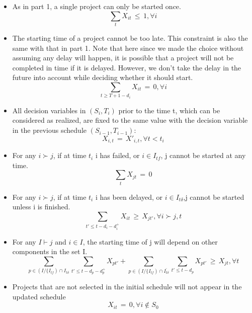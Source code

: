\documentclass[final,3p,times]{elsarticle}
\begin{document}
\begin{itemize}\label{StartCon}
\item As in part 1, a single project can only be started once.
\begin{equation}
	\label{EqnStartOnlyOnce2}
\sum\limits_{t} X_{it}\,\leq\,1,\forall i
\end{equation}
\item The starting time of a project cannot be too late. This constraint is also the same with that in part 1. Note that here since we made the choice without assuming any delay will happen, it is possible that a project will not be completed in time if it is delayed. However, we don't take the delay  in the future into account while deciding whether it should start.
\begin{equation}
\sum\limits_{t\geq T+1-d_i} X_{it}\,=\,0, \forall i
\end{equation}
\item All decision variables in $(S_i, T_i)$ prior to the time t, which can be considered as realized, are fixed to the same value with the decision variable in the previous schedule $(S_{i-1},T_{i-1})$:
\begin{equation}
X_{i,t}\,=\,X'_{i,t}, \forall t < t_i
\end{equation}
\item For any $i\succ j$, if at time $t_i$ i has failed, or $i\in I_{tf}$, j cannot be started at any time.
\begin{equation}
\sum\limits_{t} X_{jt}\,=\,0
\end{equation}
\item For any $i\succ j$, if at time $t_i$ i has been delayed, or $i\in I_{t\delta}$,j cannot be started unless i is finished.
\begin{equation}
\sum\limits_{t'\leq t-d_i-d^+_i} X_{it} \,\geq\, X_{jt'},\forall i\succ j, t 
\end{equation}
\item For any $I \vdash j$ and $i \in I$, the starting time of j will depend on other components in the set I. 
\begin{equation}
\sum\limits_{p \in (I/\{ I_{tf})\cap I_{t\delta}}\sum\limits_{t'\leq t-d_p-d^+_p} X_{pt'}+\sum\limits_{p \in (I/\{ I_{tf})\cap \bar{I_{t\delta}}}\sum\limits_{t'\leq t-d_p} X_{pt'}\,\geq\,X_{jt}, \forall t
\end{equation}
\item Projects that are not selected in the initial schedule will not appear in the updated schedule
\begin{equation}\label{EndCon}
X_{it}\,=\,0, \forall i \notin S_0 
\end{equation}

\end{itemize}
\end{document}
